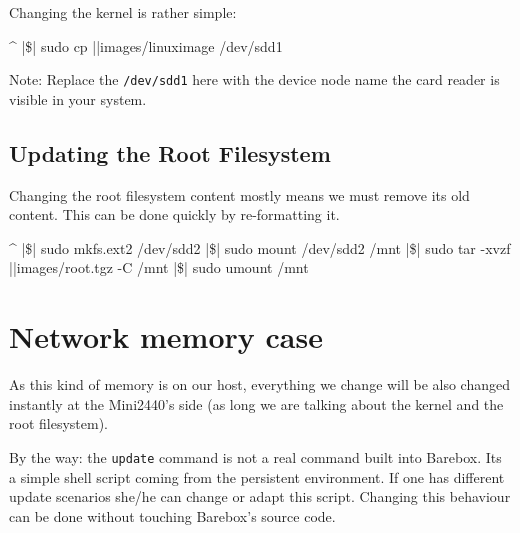 Changing the kernel is rather simple:

\begin{ptxshell}[escapechar=|]{^}
|\$| sudo cp |\ptxdistPlatformDir |images/linuximage /dev/sdd1
\end{ptxshell}

Note: Replace the \texttt{/dev/sdd1} here with the device node name the card
reader is visible in your system.

\subsection{Updating the Root Filesystem}

Changing the root filesystem content mostly means we must remove its old content.
This can be done quickly by re-formatting it.

\begin{ptxshell}[escapechar=|]{^}
|\$| sudo mkfs.ext2 /dev/sdd2
|\$| sudo mount /dev/sdd2 /mnt
|\$| sudo tar -xvzf |\ptxdistPlatformDir |images/root.tgz -C /mnt
|\$| sudo umount /mnt
\end{ptxshell}

\section{Network memory case}

As this kind of memory is on our host, everything we change will be also
changed instantly at the Mini2440's side (as long we are talking about the
kernel and the root filesystem).

By the way: the \texttt{update} command is not a real command built into
Barebox. Its a simple shell script coming from the persistent environment.
If one has different update scenarios she/he can change or adapt this script.
Changing this behaviour can be done without touching Barebox's source code.

%
